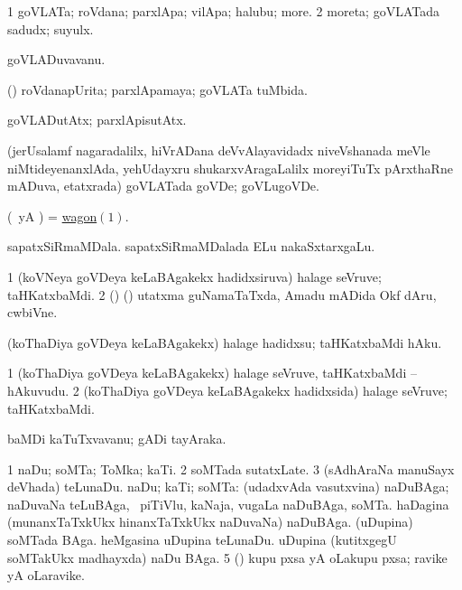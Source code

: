 \bentry
{} 
\gl{\nA}
\expl{}
\bmng
\bnum
\num{1} goVLATa; roVdana; parxlApa; vilApa; halubu; more. 
\num{2} moreta; goVLATada sadudx; suyulx. 
\enum
\emng
\eentry

\bentry
{} 
\gl{\nA}
\bmng
goVLADuvavanu. 
\emng
\eentry

\bentry
{} 
\gl{\gu}
\expl{}
\bmng
(\kAparx) roVdanapUrita; parxlApamaya; goVLATa tuMbida. 
\emng
\eentry

\bentry
{} 
\gl{\kirxvi}
\expl{}
\bmng
goVLADutAtx; parxlApisutAtx. 
\emng
\eentry

\bentry
{} 
\gl{\nA}
\expl{}
\bmng
(jerUsalamf nagaradalilx, hiVrADana deVvAlayavidadx niveVshanada meVle niMtideyenanxlAda, yehUdayxru shukarxvAragaLalilx moreyiTuTx pArxthaRne mADuva, etatxrada) goVLATada goVDe; goVLugoVDe. 
\emng
\eentry

\bentry
{} 
\gl{\nA}
\expl{}
\bmng
(\kAparx\ yA \pArxM) = \hyperlink{wagon(1)}{wagon\((1)\)}. 
\emng

\noindent 
\gl{\pagu}
\expl{}
\bmng
{} 
\banum
{} sapatxSiRmaMDala. 
 sapatxSiRmaMDalada ELu nakaSxtarxgaLu. 
\eanum
\emng
\eentry

\bentry
{} 
\gl{\nA}
\expl{}
\bmng
\bnum
\num{1} (koVNeya goVDeya keLaBAgakekx hadidxsiruva) halage seVruve; taHKatxbaMdi. 
\num{2} (\ca) (\birx) utatxma guNamaTaTxda, Amadu mADida Okf dAru, cwbiVne. 
\enum
\emng
\eentry

\bentry
{} 
\gl{\sakirx}
\bmng
(koThaDiya goVDeya keLaBAgakekx) halage hadidxsu; taHKatxbaMdi hAku. 
\emng
\eentry

\bentry
{} 
\gl{\nA}
\expl{}
\bmng
\bnum
\num{1} (koThaDiya goVDeya keLaBAgakekx) halage seVruve, taHKatxbaMdi -- hAkuvudu. 
\num{2} (koThaDiya goVDeya keLaBAgakekx hadidxsida) halage seVruve; taHKatxbaMdi. 
\enum
\emng
\eentry

\bentry
{} 
\gl{\nA}
\expl{}
\bmng
baMDi kaTuTxvavanu; gADi tayAraka. 
\emng
\eentry

\bentry
{} 
\gl{\nA}
\bmng
\bnum
\num{1} naDu; soMTa; ToMka; kaTi. 
\num{2} soMTada sutatxLate. 
\num{3} (sAdhAraNa manuSayx deVhada) teLunaDu. 
 naDu; kaTi; soMTa: 
\banum
{} (udadxvAda vasutxvina) naDuBAga; naDuvaNa teLuBAga, \udA\ piTiVlu, kaNaja, \mo vugaLa naDuBAga, soMTa. 
 haDagina (munanxTaTxkUkx hinanxTaTxkUkx naDuvaNa) naDuBAga. 
 (uDupina) soMTada BAga. 
 heMgasina uDupina teLunaDu. 
 uDupina (kutitxgegU soMTakUkx madhayxda) naDu BAga. 
\eanum
\numie
\num{5} (\ame) kupu pxsa yA oLakupu pxsa; ravike yA oLaravike. 
\enum
\emng
\eentry

